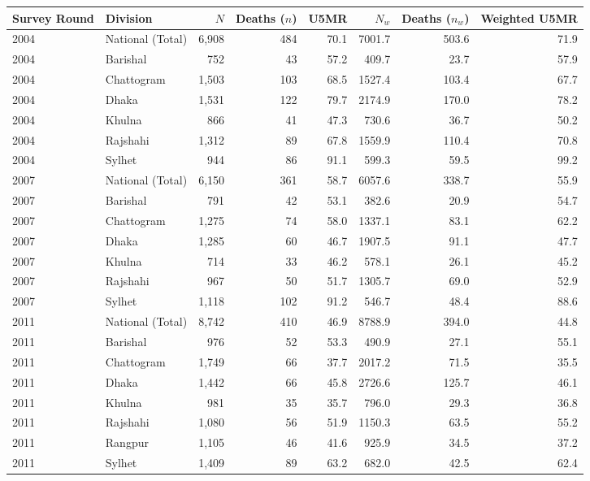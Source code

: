 \begin{table}[htbp]
\centering
\small
\begin{tabular}{llrrrrrr}
\toprule
Survey Round & Division & $N$ & Deaths ($n$) & U5MR & $N_w$ & Deaths ($n_w$) & Weighted U5MR \\
\midrule
2004 & National (Total) & 6,908 & 484 & 70.1 & 7001.7 & 503.6 & 71.9 \\
2004 & Barishal & 752 & 43 & 57.2 & 409.7 & 23.7 & 57.9 \\
2004 & Chattogram & 1,503 & 103 & 68.5 & 1527.4 & 103.4 & 67.7 \\
2004 & Dhaka & 1,531 & 122 & 79.7 & 2174.9 & 170.0 & 78.2 \\
2004 & Khulna & 866 & 41 & 47.3 & 730.6 & 36.7 & 50.2 \\
2004 & Rajshahi & 1,312 & 89 & 67.8 & 1559.9 & 110.4 & 70.8 \\
2004 & Sylhet & 944 & 86 & 91.1 & 599.3 & 59.5 & 99.2 \\
2007 & National (Total) & 6,150 & 361 & 58.7 & 6057.6 & 338.7 & 55.9 \\
2007 & Barishal & 791 & 42 & 53.1 & 382.6 & 20.9 & 54.7 \\
2007 & Chattogram & 1,275 & 74 & 58.0 & 1337.1 & 83.1 & 62.2 \\
2007 & Dhaka & 1,285 & 60 & 46.7 & 1907.5 & 91.1 & 47.7 \\
2007 & Khulna & 714 & 33 & 46.2 & 578.1 & 26.1 & 45.2 \\
2007 & Rajshahi & 967 & 50 & 51.7 & 1305.7 & 69.0 & 52.9 \\
2007 & Sylhet & 1,118 & 102 & 91.2 & 546.7 & 48.4 & 88.6 \\
2011 & National (Total) & 8,742 & 410 & 46.9 & 8788.9 & 394.0 & 44.8 \\
2011 & Barishal & 976 & 52 & 53.3 & 490.9 & 27.1 & 55.1 \\
2011 & Chattogram & 1,749 & 66 & 37.7 & 2017.2 & 71.5 & 35.5 \\
2011 & Dhaka & 1,442 & 66 & 45.8 & 2726.6 & 125.7 & 46.1 \\
2011 & Khulna & 981 & 35 & 35.7 & 796.0 & 29.3 & 36.8 \\
2011 & Rajshahi & 1,080 & 56 & 51.9 & 1150.3 & 63.5 & 55.2 \\
2011 & Rangpur & 1,105 & 46 & 41.6 & 925.9 & 34.5 & 37.2 \\
2011 & Sylhet & 1,409 & 89 & 63.2 & 682.0 & 42.5 & 62.4 \\

\end{tabular}
\end{table}
